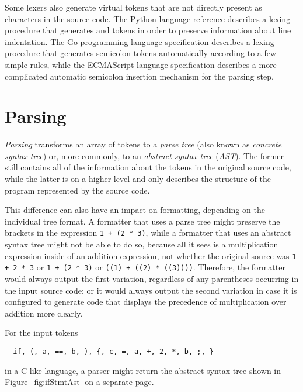 Some lexers also generate virtual tokens that are not directly present as characters in the source code.
The Python language reference describes a lexing procedure that generates
 and  tokens in order to preserve information about line indentation.
\autocite[Chapter: 2.1.8. (Lexical Analysis --- Line Structure --- Indentation)]{pythonLangRef}
The Go programming language specification describes a lexing procedure
that generates semicolon tokens automatically according to a few simple rules,
\autocite[Chapter: Lexical Elements --- Semicolons]{goProgLangSpec}
while the ECMAScript language specification describes a more complicated
automatic semicolon insertion mechanism for the parsing step.
\autocite[Chapter: 11.9 (Lexical Grammar --- Automatic Semicolon Insertion)]{ecmascriptSpec}

\section{Parsing}
\textit{Parsing} transforms an array of tokens to a \textit{parse tree} (also known as
\textit{concrete syntax tree}) or, more commonly, to an \textit{abstract syntax tree} (\textit{AST}).
The former still contains all of the information about the tokens in the original source code,
while the latter is on a higher level and only describes
the structure of the program represented by the source code.

This difference can also have an impact on formatting, depending on the individual tree format.
A formatter that uses a parse tree might preserve the brackets in the expression
\texttt{1 + (2 * 3)}, while a formatter that uses an abstract syntax tree might
not be able to do so, because all it sees is a multiplication expression inside of an addition expression,
not whether the original source was \texttt{1 + 2 * 3} or \texttt{1 + (2 * 3)}
or \texttt{((1) + ((2) * ((3))))}.
Therefore, the formatter would always output the first variation,
regardless of any parentheses occurring in the input source code;
or it would always output the second variation in case it is configured to generate code
that displays the precedence of multiplication over addition more clearly.

For the input tokens
\begin{verbatim}
  if, (, a, ==, b, ), {, c, =, a, +, 2, *, b, ;, }
\end{verbatim}
in a C-like language, a parser might return the abstract syntax tree
shown in Figure~\ref{fig:ifStmtAst} on a separate page.

